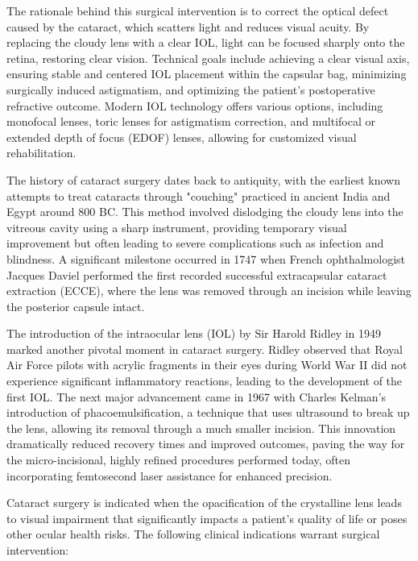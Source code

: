 The rationale behind this surgical intervention is to correct the optical defect caused by the cataract, which scatters light and reduces visual acuity. By replacing the cloudy lens with a clear IOL, light can be focused sharply onto the retina, restoring clear vision. Technical goals include achieving a clear visual axis, ensuring stable and centered IOL placement within the capsular bag, minimizing surgically induced astigmatism, and optimizing the patient's postoperative refractive outcome. Modern IOL technology offers various options, including monofocal lenses, toric lenses for astigmatism correction, and multifocal or extended depth of focus (EDOF) lenses, allowing for customized visual rehabilitation.

The history of cataract surgery dates back to antiquity, with the earliest known attempts to treat cataracts through "couching" practiced in ancient India and Egypt around 800 BC. This method involved dislodging the cloudy lens into the vitreous cavity using a sharp instrument, providing temporary visual improvement but often leading to severe complications such as infection and blindness. A significant milestone occurred in 1747 when French ophthalmologist Jacques Daviel performed the first recorded successful extracapsular cataract extraction (ECCE), where the lens was removed through an incision while leaving the posterior capsule intact.

The introduction of the intraocular lens (IOL) by Sir Harold Ridley in 1949 marked another pivotal moment in cataract surgery. Ridley observed that Royal Air Force pilots with acrylic fragments in their eyes during World War II did not experience significant inflammatory reactions, leading to the development of the first IOL. The next major advancement came in 1967 with Charles Kelman's introduction of phacoemulsification, a technique that uses ultrasound to break up the lens, allowing its removal through a much smaller incision. This innovation dramatically reduced recovery times and improved outcomes, paving the way for the micro-incisional, highly refined procedures performed today, often incorporating femtosecond laser assistance for enhanced precision.

Cataract surgery is indicated when the opacification of the crystalline lens leads to visual impairment that significantly impacts a patient's quality of life or poses other ocular health risks. The following clinical indications warrant surgical intervention:

